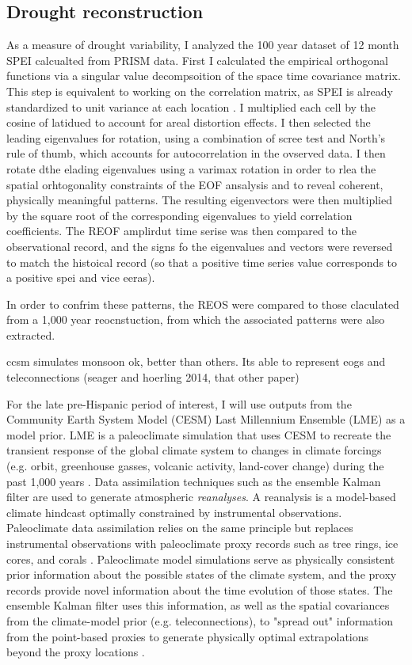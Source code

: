 \documentclass[11pt]{wlscirep}
\begin{document}
\subsection*{Drought reconstruction}
As a measure of drought variability, I analyzed the 100 year dataset of 12 month SPEI calcualted from PRISM data. First I calculated the empirical orthogonal functions via a singular value decompsoition of the space time covariance matrix. This step is equivalent to working on the correlation matrix, as SPEI is already standardized to unit variance at each location . I multiplied each cell by the cosine of latidued to account for areal distortion effects. I then selected the leading eigenvalues for rotation, using a combination of scree test and North's rule of thumb, which accounts for autocorrelation in the ovserved data. I then rotate dthe elading eigenvalues using a varimax rotation in order to rlea the spatial orhtogonality constraints of the EOF ansalysis and to reveal coherent, physically meaningful patterns. The resulting eigenvectors were then multiplied by the square root of the corresponding eigenvalues to yield correlation coefficients. The REOF amplirdut time serise was then compared to the observational record, and the signs fo the eigenvalues and vectors were reversed to match the histoical record (so that a positive time series value corresponds to a positive spei and vice eeras).

In order to confrim these patterns, the REOS were compared to those claculated from a 1,000 year reocnstuction, from which the associated patterns were also extracted.


ccsm simulates monsoon ok, better than others. 
Its able to represent eogs and teleconnections (seager and hoerling 2014, that other paper)

For the late pre-Hispanic period of interest, I will use outputs from the Community Earth System Model (CESM) Last Millennium Ensemble (LME) as a model prior. LME is a paleoclimate simulation that uses CESM to recreate the transient response of the global climate system to changes in climate forcings (e.g. orbit, greenhouse gasses, volcanic activity, land-cover change) during the past 1,000 years \cite{Otto-bliesner2015}. Data assimilation techniques such as the ensemble Kalman filter are used to generate atmospheric \textit{reanalyses}. A reanalysis is a model-based climate hindcast optimally constrained by instrumental observations. Paleoclimate data assimilation relies on the same principle but replaces instrumental observations with paleoclimate proxy records such as tree rings, ice cores, and corals \cite{Hakim2016TheResults}. Paleoclimate model simulations serve as physically consistent prior information about the possible states of the climate system, and the proxy records provide novel information about the time evolution of those states. The ensemble Kalman filter uses this information, as well as the spatial covariances from the climate-model prior (e.g. teleconnections), to "spread out" information from the point-based proxies to generate physically optimal extrapolations beyond the proxy locations \cite{Acevedo2015TowardsTechniques,Hakim2016TheResults}.
\end{document}
